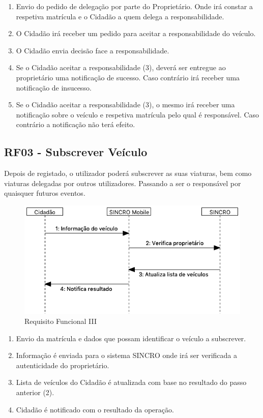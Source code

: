 \documentclass{article}
\begin{document}
\begin{enumerate}
\def\labelenumi{\arabic{enumi}.}
\item
  Envio do pedido de delegação por parte do Proprietário. Onde irá
  constar a respetiva matrícula e o Cidadão a quem delega a
  responsabilidade.
\item
  O Cidadão irá receber um pedido para aceitar a responsabilidade do
  veículo.
\item
  O Cidadão envia decisão face a responsabilidade.
\item
  Se o Cidadão aceitar a responsabilidade (3), deverá ser entregue ao
  proprietário uma notificação de sucesso. Caso contrário irá receber
  uma notificação de insucesso.
\item
  Se o Cidadão aceitar a responsabilidade (3), o mesmo irá receber uma
  notificação sobre o veículo e respetiva matrícula pelo qual é
  responsável. Caso contrário a notificação não terá efeito.
\end{enumerate}

\hypertarget{_rf03_subscrever_ve_culo}{%
\subsection{RF03 - Subscrever Veículo}\label{_rf03_subscrever_ve_culo}}

Depois de registado, o utilizador poderá subscrever as suas viaturas,
bem como viaturas delegadas por outros utilizadores. Passando a ser o
responsável por quaisquer futuros eventos.

\begin{figure}
\centering
\includegraphics[scale=0.3]{./adoc_images/sequence/rf03.png}
\caption{Requisito Funcional III}
\end{figure}

\begin{enumerate}
\def\labelenumi{\arabic{enumi}.}
\item
  Envio da matrícula e dados que possam identificar o veículo a
  subscrever.
\item
  Informação é enviada para o sistema SINCRO onde irá ser verificada a
  autenticidade do proprietário.
\item
  Lista de veículos do Cidadão é atualizada com base no resultado do
  passo anterior (2).
\item
  Cidadão é notificado com o resultado da operação.
\end{enumerate}
\end{document}
